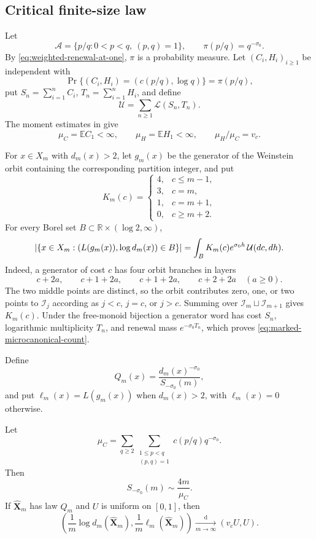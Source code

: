 \ifdefined\supplementonly
\else
\subsection{Critical finite-size law}

Let
\[
 \mathcal A=\{p/q:0<p<q,\ (p,q)=1\},
 \qquad \pi(p/q)=q^{-\sigma_0}.
\]
By \eqref{eq:weighted-renewal-at-one}, \(\pi\) is a probability measure.
Let \((C_i,H_i)_{i\ge1}\) be independent with
\[
 \Pr\{(C_i,H_i)=(c(p/q),\log q)\}=\pi(p/q),
\]
put \(S_n=\sum_{i=1}^nC_i\), \(T_n=\sum_{i=1}^nH_i\), and define
\[
 \mathcal U=\sum_{n\ge1}\mathcal L(S_n,T_n).
\]
The moment estimates in  give
\[
 \mu_C=\mathbb EC_1<\infty,
 \qquad \mu_H=\mathbb EH_1<\infty,
 \qquad \mu_H/\mu_C=v_c.
\]

For \(x\in X_m\) with \(d_m(x)>2\), let \(g_m(x)\) be the generator of the
Weinstein orbit containing the corresponding partition integer, and put
\[
 K_m(c)=
 \begin{cases}
 4,&c\le m-1,\\
 3,&c=m,\\
 1,&c=m+1,\\
 0,&c\ge m+2.
 \end{cases}
\]
For every Borel set \(B\subset\mathbb R\times(\log2,\infty)\),
\begin{equation}
 \lvert \{x\in X_m:(L(g_m(x)),\log d_m(x))\in B\} \rvert
 =\int_B K_m(c)e^{\sigma_0h}\,\mathcal U(dc,dh).
 \label{eq:marked-microcanonical-count}
\end{equation}
Indeed, a generator of cost \(c\) has four orbit branches in layers
\[
 c+2a,\qquad c+1+2a,\qquad c+1+2a,\qquad c+2+2a
 \quad(a\ge0).
\]
The two middle points are distinct, so the orbit contributes zero, one, or
two points to \(\mathcal I_j\) according as \(j<c\), \(j=c\), or \(j>c\).
Summing over \(\mathcal I_m\sqcup\mathcal I_{m+1}\) gives \(K_m(c)\).
Under the free-monoid bijection a generator word has cost \(S_n\), logarithmic
multiplicity \(T_n\), and renewal mass \(e^{-\sigma_0T_n}\), which proves
\eqref{eq:marked-microcanonical-count}.

Define
\[
 \widehat Q_m(x)=\frac{d_m(x)^{-\sigma_0}}{S_{-\sigma_0}(m)},
\]
and put \(\ell_m(x)=L(g_m(x))\) when \(d_m(x)>2\), with
\(\ell_m(x)=0\) otherwise.

\begin{theorem}
\label{thm:critical-finite-window-gibbs}
Let
\[
 \mu_C=\sum_{q\ge2}\sum_{\substack{1\le p<q\\(p,q)=1}}
 c(p/q)q^{-\sigma_0}.
\]
Then
\begin{equation}
 S_{-\sigma_0}(m)\sim\frac{4m}{\mu_C}.
 \label{eq:critical-linear-finite-size}
\end{equation}
If \(\widehat{\mathbf X}_m\) has law \(\widehat Q_m\) and \(U\) is uniform
on \([0,1]\), then
\begin{equation}
 \left(
 \frac1m\log d_m(\widehat{\mathbf X}_m),
 \frac1m\ell_m(\widehat{\mathbf X}_m)
 \right)
 \xrightarrow[m\to\infty]{\mathrm d}(v_cU,U).
 \label{eq:critical-uniform-coexistence}
\end{equation}
\end{theorem}

